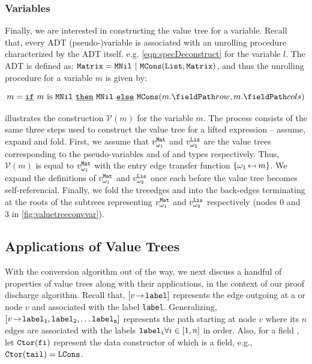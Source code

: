 \subsubsection{Variables}
Finally, we are interested in constructing the value tree for a variable.
Recall that, every ADT (pseudo-)variable is associated with an unrolling procedure
characterized by the ADT itself. e.g. \cref{eqn:specDeconstruct}
for the  variable $l$.
The  ADT is defined as:
${\tt Matrix} = {\tt MNil} \ | \ {\tt MCons}({\tt List},{\tt Matrix})$,
and thus the unrolling procedure for a  variable $m$ is given by:

\begin{equation}
\label{matrixunrollingprocedure}
m = \sumIf{\sumIs{m}{MNil}} \  \sumThen{\cons{MNil}} \  \sumElse{\cons{MCons}(\prodAccess{m}{row}, \prodAccess{m}{cols})}
\end{equation}

 illustrates the construction $\mathcal{V}(m)$ for the  variable $m$.
The process consists of the same three steps used to construct the value tree
for a lifted expression -- assume, expand and fold.
First, we assume that $v_{\omega_{1}\!}^{\tt Mat}$ and $v_{\omega_{2}\!}^{\tt Lis}$ are the value trees
corresponding to the pseudo-variables  and  of  and 
types respectively.
Thus, $\mathcal{V}(m)$ is equal to $v_{\omega_{1}\!}^{\tt Mat}$ with the entry edge transfer function
$\{ {\omega_{1}\!} \mapsfrom m \}$.
We expand the definitions of $v_{\omega_{1}\!}^{\tt Mat}$ and $v_{\omega_{2}\!}^{\tt Lis}$ once each before
the value tree becomes self-referencial.
Finally, we fold the treeedges  and  into the back-edges
terminating at the roots of the subtrees representing $v_{\omega_{1}\!}^{\tt Mat}$ and $v_{\omega_{2}\!}^{\tt Lis}$
respectively (nodes 0 and 3 in \cref{fig:valuetreeconvvar}).

\subsection{Applications of Value Trees}
\label{sec:valuetreeapps}
With the conversion algorithm out of the way, we next discuss a handful of properties of value trees along with
their applications, in the context of our proof discharge algorithm.
Recall that, ${[v \! \rightarrow \! {\tt label}]}$ represents the edge outgoing at a \sumn{} or \prodn{} node $v$ and associated with
the label {\tt label}.
Generalizing, ${[v \! \rightarrow \! {\tt label_1,label_2,\dots label_n}]}$ represents the path starting at node $v$ where its $n$ edges
are associated with the labels ${\tt label_i} \forall i \in [1,n]$ in order.
Also, for a field , let ${\tt Ctor}{}({{\tt fi}})$ represent the data constructor of which  is a field,
e.g., ${\tt Ctor}{}({{\tt tail}}) = {\tt LCons}$.

